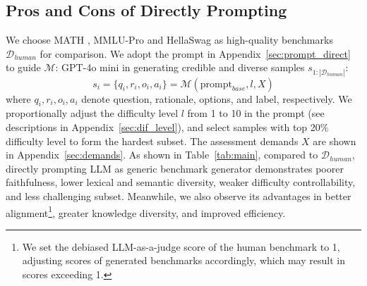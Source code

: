 \subsection{Pros and Cons of Directly Prompting}
\label{sec:proscons}
We choose MATH \citep{math}, MMLU-Pro \citep{mmlupro} and HellaSwag \citep{hellaswag} as high-quality benchmarks $\mathcal{D}_{human}$ for comparison. We adopt the prompt in Appendix~\ref{sec:prompt_direct} to guide $\mathcal{M}$: GPT-4o mini in generating credible and diverse samples $s_{1:|\mathcal{D}_{human}|}$:
\begin{equation}
    s_i = \{q_i,r_i,o_i,a_i\} = \mathcal{M}(\text{prompt}_{base},l,X)
\end{equation}
where $q_i,r_i,o_i,a_i$ denote question, rationale, options, and label, respectively. We proportionally adjust the difficulty level $l$ from 1 to 10 in the prompt (see descriptions in Appendix~\ref{sec:dif_level}), and select samples with top 20\% difficulty level to form the hardest subset. 
The assessment demands $X$ are shown in Appendix~\ref{sec:demands}.
As shown in Table~\ref{tab:main}, compared to $\mathcal{D}_{human}$, directly prompting LLM as generic benchmark generator demonstrates poorer faithfulness, lower lexical and semantic diversity, weaker difficulty controllability, and less challenging subset. 
Meanwhile, we also observe its advantages in better alignment\footnote{We set the debiased LLM-as-a-judge score of the human benchmark to 1, adjusting scores of generated benchmarks accordingly, which may result in scores exceeding 1.}, greater knowledge diversity, and improved efficiency. 

